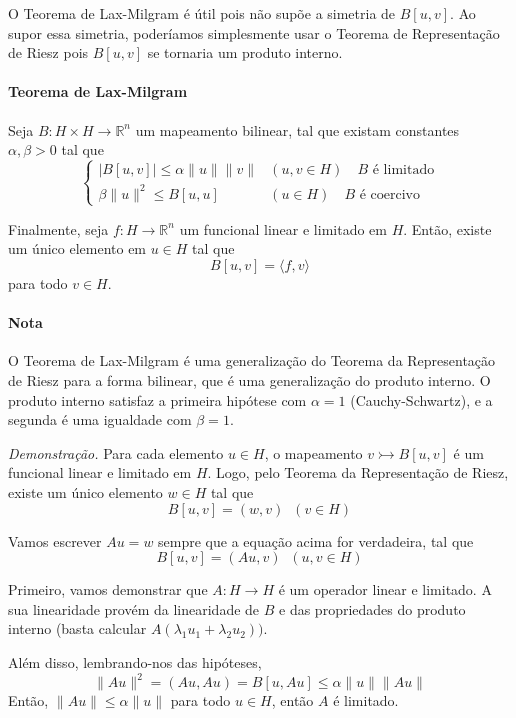 \documentclass[a4paper, 11pt]{book}
\begin{document}
O Teorema de Lax-Milgram é útil pois não supõe a simetria de $B[u,v]$. Ao supor essa simetria, poderíamos simplesmente usar o Teorema de Representação de Riesz pois $B[u,v]$ se tornaria um produto interno. 

\paragraph{Teorema de Lax-Milgram}\label{t:eliptic-lax-milgram}

Seja $B: H \times H \rightarrow {\mathbb{R}^n}$ um mapeamento bilinear, tal que existam constantes $\alpha, \beta > 0$ tal que 
\[
\begin{cases}
	| B[u,v] | \leq \alpha \|u\| \|v\| & (u,v \in H) \quad B \text{ é limitado}\\
	\beta \|u\|^2 \leq B[u,u] & (u \in H) \quad B \text{ é coercivo}
\end{cases}	
\]

Finalmente, seja $f: H \rightarrow {\mathbb{R}^n}$ um funcional linear e limitado em $H$. Então, existe um único elemento em $u \in H$ tal que
\[
	B[u,v] = \langle f, v \rangle	
\]
para todo $v \in H$.

\paragraph*{Nota} O Teorema de Lax-Milgram é  uma generalização do Teorema da Representação de Riesz para a forma bilinear, que é uma generalização do produto interno. O produto interno satisfaz a primeira hipótese com $\alpha=1$ (Cauchy-Schwartz), e a segunda é uma igualdade com $\beta=1$.

\textit{Demonstração.} Para cada elemento $u \in H$, o mapeamento $v \rightarrowtail B[u,v]$ é um funcional linear e limitado em $H$. Logo, pelo Teorema da Representação de Riesz, existe um único elemento $w \in H$ tal que
\[
	B[u,v] = (w,v) \;\; (v \in H)
\]

Vamos escrever $Au=w$ sempre que a equação acima for verdadeira, tal que
\[
	B[u,v] = (Au, v) \;\; (u, v \in H)	
\]

Primeiro, vamos demonstrar que $A: H \rightarrow H$ é um operador linear e limitado. A sua linearidade provém da linearidade de $B$ e das propriedades do produto interno (basta calcular $A(\lambda_1u_1 + \lambda_2u_2))$.

Além disso, lembrando-nos das hipóteses,
\[
	\|Au\|^2 = (Au, Au) = B[u, Au] \leq \alpha \|u\| \| Au\|
\]
Então, $\| Au \| \leq \alpha \| u \|$ para todo $u \in H$, então $A$ é limitado. 
\end{document}

